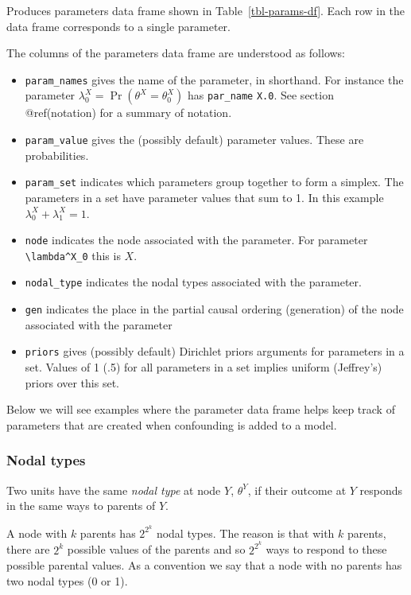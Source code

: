 \documentclass[
  11pt,
  article]{jss}
\providecommand{\tightlist}{%
  \setlength{\itemsep}{0pt}\setlength{\parskip}{0pt}}\usepackage{longtable,booktabs,array}
\begin{document}
Produces parameters data frame shown in Table~\ref{tbl-params-df}. Each
row in the data frame corresponds to a single parameter.

The columns of the parameters data frame are understood as follows:

\begin{itemize}
\tightlist
\item
  \texttt{param\_names} gives the name of the parameter, in shorthand.
  For instance the parameter
  \(\lambda^X_0 = \Pr(\theta^X = \theta^X_0)\) has \texttt{par\_name}
  \texttt{X.0}. See section @ref(notation) for a summary of notation.
\item
  \texttt{param\_value} gives the (possibly default) parameter values.
  These are probabilities.\\
\item
  \texttt{param\_set} indicates which parameters group together to form
  a simplex. The parameters in a set have parameter values that sum to
  1. In this example \(\lambda^X_0 + \lambda^X_1 = 1\).
\item
  \texttt{node} indicates the node associated with the parameter. For
  parameter \texttt{\textbackslash{}lambda\^{}X\_0} this is \(X\).
\item
  \texttt{nodal\_type} indicates the nodal types associated with the
  parameter.
\item
  \texttt{gen} indicates the place in the partial causal ordering
  (generation) of the node associated with the parameter
\item
  \texttt{priors} gives (possibly default) Dirichlet priors arguments
  for parameters in a set. Values of 1 (.5) for all parameters in a set
  implies uniform (Jeffrey's) priors over this set.
\end{itemize}

Below we will see examples where the parameter data frame helps keep
track of parameters that are created when confounding is added to a
model.

\hypertarget{sec-nodal-types}{%
\subsubsection{Nodal types}\label{sec-nodal-types}}

Two units have the same \emph{nodal type} at node \(Y\), \(\theta^Y\),
if their outcome at \(Y\) responds in the same ways to parents of \(Y\).

A node with \(k\) parents has \(2^{2^k}\) nodal types. The reason is
that with \(k\) parents, there are \(2^k\) possible values of the
parents and so \(2^{2^k}\) ways to respond to these possible parental
values. As a convention we say that a node with no parents has two nodal
types (0 or 1).
\end{document}
